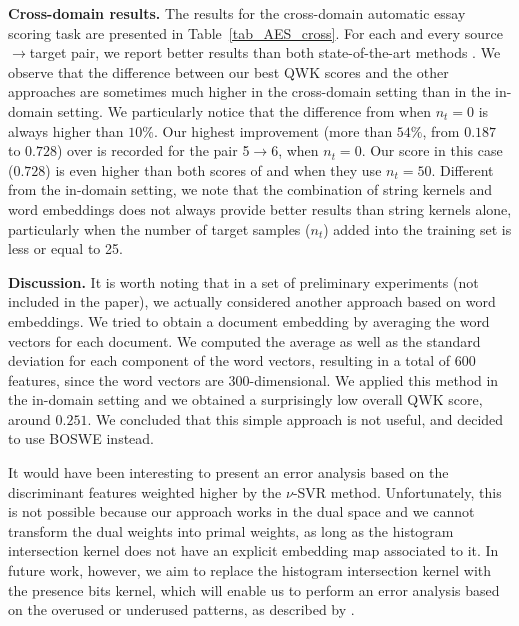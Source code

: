 \documentclass[11pt,a4paper]{article}
\begin{document}
\noindent
{\bf Cross-domain results.} The results for the cross-domain automatic essay scoring task are presented in Table~\ref{tab_AES_cross}. For each and every source$\rightarrow$target pair, we report better results than both state-of-the-art methods \cite{Phandi-EMNLP-2015,Dong-EMNLP-2016}. We observe that the difference between our best QWK scores and the other approaches are sometimes much higher in the cross-domain setting than in the in-domain setting. We particularly notice that the difference from \cite{Phandi-EMNLP-2015} when $n_t = 0$ is always higher than $10\%$. Our highest improvement (more than $54\%$, from $0.187$ to $0.728$) over \cite{Phandi-EMNLP-2015} is recorded for the pair 5$\rightarrow$6, when $n_t = 0$. Our score in this case ($0.728$) is even higher than both scores of  and  when they use $n_t = 50$. Different from the in-domain setting, we note that the combination of string kernels and word embeddings does not always provide better results than string kernels alone, particularly when the number of target samples ($n_t$) added into the training set is less or equal to 25.

\noindent
{\bf Discussion.} It is worth noting that in a set of preliminary experiments (not included in the paper), we actually considered another approach based on word embeddings. We tried to obtain a document embedding by averaging the word vectors for each document. We computed the average as well as the standard deviation for each component of the word vectors, resulting in a total of $600$ features, since the word vectors are $300$-dimensional. We applied this method in the in-domain setting and we obtained a surprisingly low overall QWK score, around $0.251$. We concluded that this simple approach is not useful, and decided to use BOSWE \cite{Ionescu-KES-2017} instead.

It would have been interesting to present an error analysis based on the discriminant features weighted higher by the $\nu$-SVR method. Unfortunately, this is not possible because our approach works in the dual space and we cannot transform the dual weights into primal weights, as long as the histogram intersection kernel does not have an explicit embedding map associated to it. In future work, however, we aim to replace the histogram intersection kernel with the presence bits kernel, which will enable us to perform an error analysis based on the overused or underused patterns, as described by .
\end{document}

